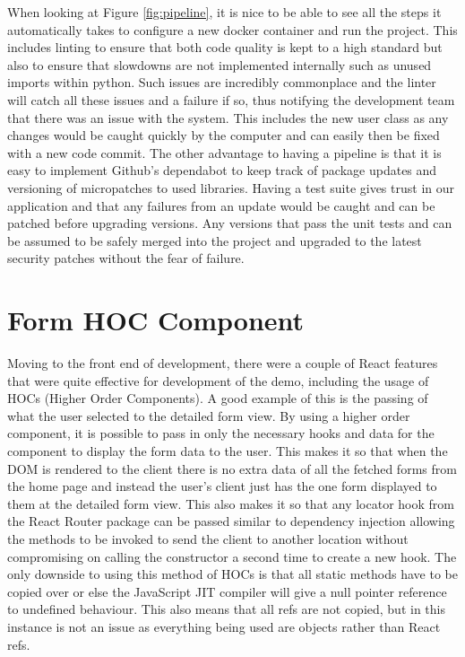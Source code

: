 When looking at Figure \ref{fig:pipeline}, it is nice to be able to see all the steps it automatically takes to configure a new docker container and run the project. This includes linting to ensure that both code quality is kept to a high standard but also to ensure that slowdowns are not implemented internally such as unused imports within python. Such issues are incredibly commonplace and the linter will catch all these issues and a failure if so, thus notifying the development team that there was an issue with the system. This includes the new user class as any changes would be caught quickly by the computer and can easily then be fixed with a new code commit.
\newline
\newline
The other advantage to having a pipeline is that it is easy to implement Github's dependabot to keep track of package updates and versioning of micropatches to used libraries. Having a test suite gives trust in our application and that any failures from an update would be caught and can be patched before upgrading versions. Any versions that pass the unit tests and can be assumed to be safely merged into the project and upgraded to the latest security patches without the fear of failure.

\section{Form HOC Component}

Moving to the front end of development, there were a couple of React features that were quite effective for development of the demo, including the usage of HOCs (Higher Order Components). A good example of this is the passing of what the user selected to the detailed form view. By using a higher order component, it is possible to pass in only the necessary hooks and data for the component to display the form data to the user. This makes it so that when the DOM is rendered to the client there is no extra data of all the fetched forms from the home page and instead the user’s client just has the one form displayed to them at the detailed form view. This also makes it so that any locator hook from the React Router package can be passed similar to dependency injection allowing the methods to be invoked to send the client to another location without compromising on calling the constructor a second time to create a new hook.
\newline
\newline
The only downside to using this method of HOCs is that all static methods have to be copied over or else the JavaScript JIT compiler will give a null pointer reference to undefined behaviour. This also means that all refs are not copied, but in this instance is not an issue as everything being used are objects rather than React refs.

